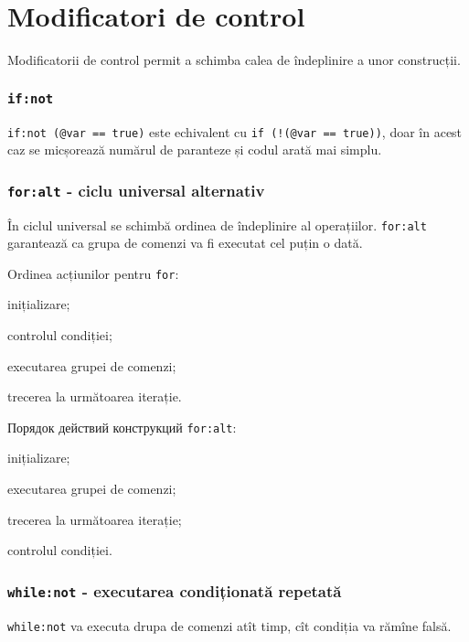 
\section{Modificatori de control}

Modificatorii de control permit a schimba calea de îndeplinire a unor construcții.

\subsubsection{\lstinline|if:not|}

\lstinline|if:not (@var == true)| este echivalent cu \lstinline|if (!(@var == true))|, doar în acest caz se micșorează numărul de paranteze și codul arată mai simplu.

\subsubsection{\lstinline|for:alt| - ciclu universal alternativ}

În ciclul universal se schimbă ordinea de îndeplinire al operațiilor. \lstinline|for:alt| garantează ca grupa de comenzi va fi executat cel puțin o dată.

Ordinea acțiunilor pentru \lstinline|for|:
\begin{icEnum}
    \item inițializare;
	\item controlul condiției;
	\item executarea grupei de comenzi;
	\item trecerea la următoarea iterație.
\end{icEnum}

Порядок действий конструкций \lstinline|for:alt|:
\begin{icEnum}
    \item inițializare;
	\item executarea grupei de comenzi;
	\item trecerea la următoarea iterație;
	\item controlul condiției.
\end{icEnum}

\subsubsection{\lstinline|while:not| - executarea condiționată repetată}

\lstinline|while:not| va executa drupa de comenzi atît timp, cît condiția va rămîne falsă.

